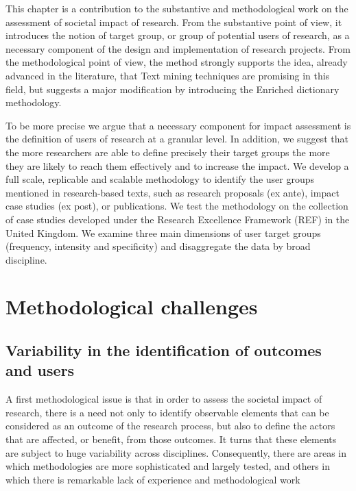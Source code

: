 \documentclass[b5paper,]{book}
\theoremstyle{definition}
\theoremstyle{definition}
\theoremstyle{definition}
\theoremstyle{remark}
\begin{document}
This chapter is a contribution to the substantive and methodological
work on the assessment of societal impact of research. From the
substantive point of view, it introduces the notion of target group, or
group of potential users of research, as a necessary component of the
design and implementation of research projects. From the methodological
point of view, the method strongly supports the idea, already advanced
in the literature, that Text mining techniques are promising in this
field, but suggests a major modification by introducing the Enriched
dictionary methodology.

To be more precise we argue that a necessary component for impact
assessment is the definition of users of research at a granular level.
In addition, we suggest that the more researchers are able to define
precisely their target groups the more they are likely to reach them
effectively and to increase the impact. We develop a full scale,
replicable and scalable methodology to identify the user groups
mentioned in research-based texts, such as research proposals (ex ante),
impact case studies (ex post), or publications. We test the methodology
on the collection of case studies developed under the Research
Excellence Framework (REF) in the United Kingdom. We examine three main
dimensions of user target groups (frequency, intensity and specificity)
and disaggregate the data by broad discipline.

\section{Methodological challenges}\label{methodological-challenges}

\subsection{Variability in the identification of outcomes and
users}\label{variability-in-the-identification-of-outcomes-and-users}

A first methodological issue is that in order to assess the societal
impact of research, there is a need not only to identify observable
elements that can be considered as an outcome of the research process,
but also to define the actors that are affected, or benefit, from those
outcomes. It turns that these elements are subject to huge variability
across disciplines. Consequently, there are areas in which methodologies
are more sophisticated and largely tested, and others in which there is
remarkable lack of experience and methodological work
\citep[\citet{cturcan2015national}]{stern2013long, mitton2007knowledge}
\end{document}
